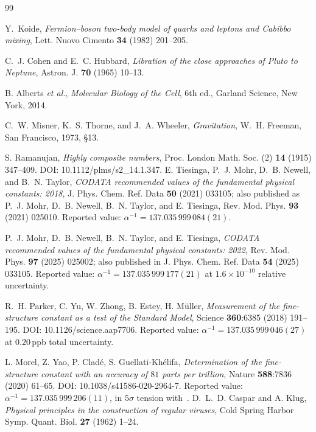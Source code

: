 \documentclass[11pt,a4paper]{article}
\theoremstyle{definition}
\theoremstyle{remark}
\begin{document}
\begin{thebibliography}{99}

Y.~Koide,
\emph{Fermion--boson two-body model of quarks and leptons and Cabibbo mixing},
Lett. Nuovo Cimento {\bf 34} (1982) 201--205.

C.~J. Cohen and E.~C. Hubbard,
\emph{Libration of the close approaches of Pluto to Neptune},
Astron. J. {\bf 70} (1965) 10--13.

B. Alberts \emph{et al.},
\emph{Molecular Biology of the Cell}, 6th ed., Garland Science, New York, 2014.

C.~W. Misner, K.~S. Thorne, and J.~A. Wheeler,
\emph{Gravitation}, W.~H. Freeman, San Francisco, 1973, \S 13.


S. Ramanujan,
\emph{Highly composite numbers},
Proc. London Math. Soc. (2) {\bf 14} (1915) 347--409.
DOI: 10.1112/plms/s2\_14.1.347.
E. Tiesinga, P.~J. Mohr, D.~B. Newell, and B.~N. Taylor,
\emph{CODATA recommended values of the fundamental physical constants: 2018},
J. Phys. Chem. Ref. Data {\bf 50} (2021) 033105;
also published as P.~J. Mohr, D.~B. Newell, B.~N. Taylor, and E. Tiesinga,
Rev. Mod. Phys. {\bf 93} (2021) 025010.
Reported value: $\alpha^{-1} = 137.035\,999\,084(21)$.

P.~J. Mohr, D.~B. Newell, B.~N. Taylor, and E. Tiesinga,
\emph{CODATA recommended values of the fundamental physical constants: 2022},
Rev. Mod. Phys. {\bf 97} (2025) 025002;
also published in J. Phys. Chem. Ref. Data {\bf 54} (2025) 033105.
Reported value: $\alpha^{-1} = 137.035\,999\,177(21)$ at $1.6\times 10^{-10}$ relative uncertainty.


R.~H. Parker, C. Yu, W. Zhong, B. Estey, H. M\"uller,
\emph{Measurement of the fine-structure constant as a test of the Standard Model},
Science {\bf 360}:6385 (2018) 191--195.
DOI: 10.1126/science.aap7706.
Reported value: $\alpha^{-1} = 137.035\,999\,046(27)$ at $0.20$\,ppb total uncertainty.

L. Morel, Z. Yao, P. Clad\'e, S. Guellati-Kh\'elifa,
\emph{Determination of the fine-structure constant with an accuracy of $81$ parts per trillion},
Nature {\bf 588}:7836 (2020) 61--65.
DOI: 10.1038/s41586-020-2964-7.
Reported value: $\alpha^{-1} = 137.035\,999\,206(11)$, in $5\sigma$ tension with~\cite{Parker2018}.
D.~L.~D. Caspar and A. Klug,
\emph{Physical principles in the construction of regular viruses},
Cold Spring Harbor Symp. Quant. Biol. {\bf 27} (1962) 1--24.


\end{thebibliography}
\end{document}
